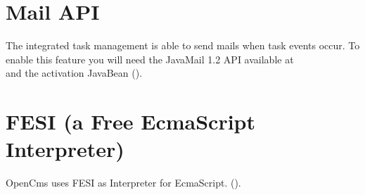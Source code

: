 \section{Mail API}
The integrated task management is able to send mails when task events occur.
To enable this feature you will need the JavaMail 1.2 API available at \\
 and the activation JavaBean
().

\section{FESI (a Free EcmaScript Interpreter)}
OpenCms uses FESI as Interpreter for EcmaScript.
().
